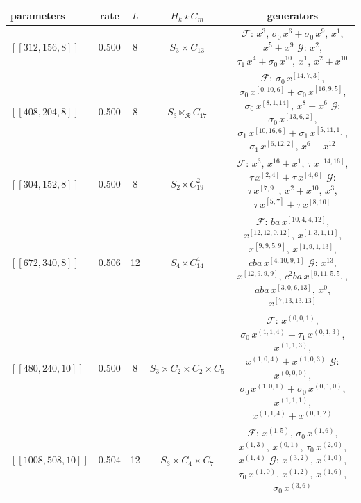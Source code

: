 \begin{table}[t]
\centering
\scriptsize\linespread{1.35}\selectfont
\begin{tabular}{lcccc}
\toprule
parameters & rate & $L$ & $H_k\star C_m$ & generators \\
\midrule
$[[312, 156, 8]]$ & 0.500 & 8 & $S_{3} \times C_{13}$ & \parbox[t]{0.46\textwidth}{\raggedright $\mathcal{F}$: $x^{3}$, $\sigma_0\,x^{6}{+}\sigma_0\,x^{9}$, $x^{1}$, $x^{5}{+}x^{9}$ \\ $\mathcal{G}$: $x^{2}$, $\tau_1\,x^{4}{+}\sigma_0\,x^{10}$, $x^{1}$, $x^{2}{+}x^{10}$} \\
$[[408, 204, 8]]$ & 0.500 & 8 & $S_{3} \ltimes_{\mathcal{R}} C_{17}$ & \parbox[t]{0.46\textwidth}{\raggedright $\mathcal{F}$: $\sigma_0\,x^{[14,7,3]}$, $\sigma_0\,x^{[0,10,6]}{+}\sigma_0\,x^{[16,9,5]}$, $\sigma_0\,x^{[8,1,14]}$, $x^{8}{+}x^{6}$ \\ $\mathcal{G}$: $\sigma_0\,x^{[13,6,2]}$, $\sigma_1\,x^{[10,16,6]}{+}\sigma_1\,x^{[5,11,1]}$, $\sigma_1\,x^{[6,12,2]}$, $x^{6}{+}x^{12}$} \\
$[[304, 152, 8]]$ & 0.500 & 8 & $S_{2} \ltimes C_{19}^{2}$ & \parbox[t]{0.46\textwidth}{\raggedright $\mathcal{F}$: $x^{3}$, $x^{16}{+}x^{1}$, $\tau\,x^{[14,16]}$, $\tau\,x^{[2,4]}{+}\tau\,x^{[4,6]}$ \\ $\mathcal{G}$: $\tau\,x^{[7,9]}$, $x^{2}{+}x^{10}$, $x^{3}$, $\tau\,x^{[5,7]}{+}\tau\,x^{[8,10]}$} \\
$[[672, 340, 8]]$ & 0.506 & 12 & $S_{4} \ltimes C_{14}^{4}$ & \parbox[t]{0.46\textwidth}{\raggedright $\mathcal{F}$: $ba\,x^{[10,4,4,12]}$, $x^{[12,12,0,12]}$, $x^{[1,3,1,11]}$, $x^{[9,9,5,9]}$, $x^{[1,9,1,13]}$, $cba\,x^{[4,10,9,1]}$ \\ $\mathcal{G}$: $x^{13}$, $x^{[12,9,9,9]}$, $c^{2}ba\,x^{[9,11,5,5]}$, $aba\,x^{[3,0,6,13]}$, $x^{0}$, $x^{[7,13,13,13]}$} \\
$[[480, 240, 10]]$ & 0.500 & 8 & $S_{3} \times C_{2}\!\times\!C_{2}\!\times\!C_{5}$ & \parbox[t]{0.46\textwidth}{\raggedright $\mathcal{F}$: $x^{(0,0,1)}$, $\sigma_0\,x^{(1,1,4)}{+}\tau_1\,x^{(0,1,3)}$, $x^{(1,1,3)}$, $x^{(1,0,4)}{+}x^{(1,0,3)}$ \\ $\mathcal{G}$: $x^{(0,0,0)}$, $\sigma_0\,x^{(1,0,1)}{+}\sigma_0\,x^{(0,1,0)}$, $x^{(1,1,1)}$, $x^{(1,1,4)}{+}x^{(0,1,2)}$} \\
$[[1008, 508, 10]]$ & 0.504 & 12 & $S_{3} \times C_{4}\!\times\!C_{7}$ & \parbox[t]{0.46\textwidth}{\raggedright $\mathcal{F}$: $x^{(1,5)}$, $\sigma_0\,x^{(1,6)}$, $x^{(1,3)}$, $x^{(0,1)}$, $\tau_0\,x^{(2,0)}$, $x^{(1,4)}$ \\ $\mathcal{G}$: $x^{(3,2)}$, $x^{(1,0)}$, $\tau_0\,x^{(1,0)}$, $x^{(1,2)}$, $x^{(1,6)}$, $\sigma_0\,x^{(3,6)}$} \\

\end{tabular}
\end{table}
